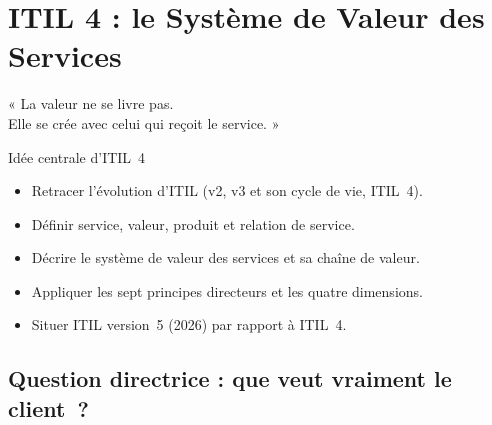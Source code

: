 
\chapter{ITIL 4 : le Système de Valeur des Services}
\label{chap:itil-svs}

\epigraph{%
    « La valeur ne se livre pas.\\
    Elle se crée avec celui qui reçoit le service. »%
}{Idée centrale d'ITIL~4}


\begin{boxobjectifs}
\begin{itemize}
    \item Retracer l'évolution d'ITIL (v2, v3 et son cycle de vie, ITIL~4).
    \item Définir service, valeur, produit et relation de service.
    \item Décrire le système de valeur des services et sa chaîne de valeur.
    \item Appliquer les sept principes directeurs et les quatre dimensions.
    \item Situer ITIL version~5 (2026) par rapport à ITIL~4.
\end{itemize}
\end{boxobjectifs}

\bigskip

\section*{Question directrice : que veut vraiment le client~?}

